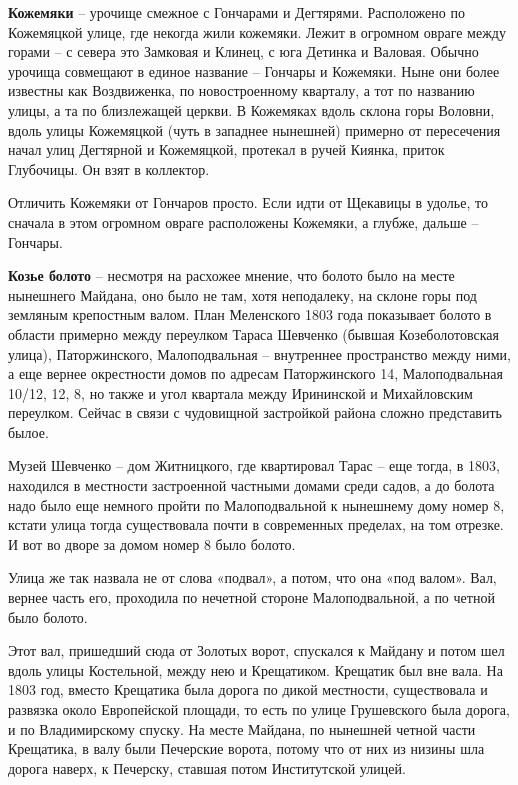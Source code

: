 \medskip


\textbf{Кожемяки} – урочище смежное с Гончарами и Дегтярями. Расположено по Кожемяцкой улице, где некогда жили кожемяки. Лежит в огромном овраге между горами – с севера это Замковая и Клинец, с юга Детинка и Валовая. Обычно урочища совмещают в единое название – Гончары и Кожемяки. Ныне они более известны как Воздвиженка, по новостроенному кварталу, а тот по названию улицы, а та по близлежащей церкви. В Кожемяках вдоль склона горы Воловни, вдоль улицы Кожемяцкой (чуть в западнее нынешней) примерно от пересечения начал улиц Дегтярной и Кожемяцкой, протекал в ручей Киянка, приток Глубочицы. Он взят в коллектор.

Отличить Кожемяки от Гончаров просто. Если идти от Щекавицы в удолье, то сначала в этом огромном овраге расположены Кожемяки, а глубже, дальше – Гончары.\\

\medskip

\textbf{Козье болото} – несмотря на расхожее мнение, что болото было на месте нынешнего Майдана, оно было не там, хотя неподалеку, на склоне горы под земляным крепостным валом. План Меленского 1803 года показывает болото в области примерно между переулком Тараса Шевченко (бывшая Козеболотовская улица), Паторжинского, Малоподвальная – внутреннее пространство между ними, а еще вернее окрестности домов по адресам Паторжинского 14, Малоподвальная 10/12, 12, 8, но также и угол квартала между Ирининской и Михайловским переулком. Сейчас в связи с чудовищной застройкой района сложно представить былое.

Музей Шевченко – дом Житницкого, где квартировал Тарас – еще тогда, в 1803, находился в местности застроенной частными домами среди садов, а до болота надо было еще немного пройти по Малоподвальной к нынешнему дому номер 8, кстати улица тогда существовала почти в современных пределах, на том отрезке. И вот во дворе за домом номер 8 было болото.

Улица же так назвала не от слова «подвал», а потом, что она «под валом». Вал, вернее часть его, проходила по нечетной стороне Малоподвальной, а по четной было болото. 

Этот вал, пришедший сюда от Золотых ворот, спускался к Майдану и потом шел вдоль улицы Костельной, между нею и Крещатиком. Крещатик был вне вала. На 1803 год, вместо Крещатика была дорога по дикой местности, существовала и развязка около Европейской площади, то есть по улице Грушевского была дорога, и по Владимирскому спуску. На месте Майдана, по нынешней четной части Крещатика, в валу были Печерские ворота, потому что от них из низины шла дорога наверх, к Печерску, ставшая потом Институтской улицей.

